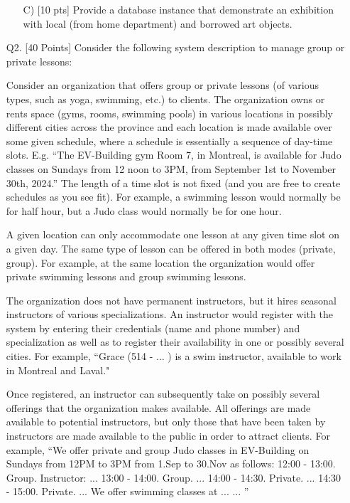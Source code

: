 \documentclass[12pt]{article}
\begin{document}
\begin{spacing}{1.5}
\begin{enumerate}
\begin{enumerate}
                        \item[C)] [10 pts] Provide a database instance that demonstrate an exhibition with local (from home department) and borrowed art objects.


                  \end{enumerate}

                  \newpage

            \item[Q2.] [40 Points] Consider the following system description to manage group or private lessons:

                  Consider an organization that offers group or private lessons (of various types, such as yoga, swimming, etc.) to clients. The organization owns or rents space (gyms, rooms, swimming pools) in various locations in possibly different cities across the province and each location is made available over some given schedule, where a schedule is essentially a sequence of day-time slots. E.g. “The EV-Building gym Room 7, in Montreal, is available for Judo classes on Sundays from 12 noon to 3PM, from September 1st to November 30th, 2024.” The length of a time slot is not fixed (and you are free to create schedules as you see fit). For example, a swimming lesson would normally be for half hour, but a Judo class would normally be for one hour.

                  A given location can only accommodate one lesson at any given time slot on a given day. The same type of lesson can be offered in both modes (private, group). For example, at the same location the organization would offer private swimming lessons and group swimming lessons.

                  The organization does not have permanent instructors, but it hires seasonal instructors of various specializations. An instructor would register with the system by entering their credentials (name and phone number) and specialization as well as to register their availability in one or possibly several cities. For example, “Grace (514 - ... ) is a swim instructor, available to work in Montreal and Laval."

                  Once registered, an instructor can subsequently take on possibly several offerings that the organization makes available. All offerings are made available to potential instructors, but only those that have been taken by instructors are made available to the public in order to attract clients. For example, “We offer private and group Judo classes in EV-Building on Sundays from 12PM to 3PM from 1.Sep to 30.Nov as follows: 12:00 - 13:00. Group. Instructor: ... 13:00 - 14:00. Group. ... 14:00 - 14:30. Private. ... 14:30 - 15:00. Private. ... We offer swimming classes at ... ... ”


\end{enumerate}
\end{spacing}
\end{document}
